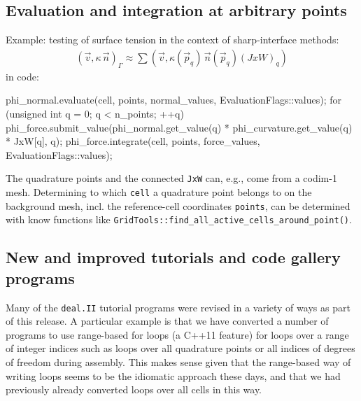 \documentclass{ansarticle-preprint}
\newcommand{\specialword}[1]{\texttt{#1}}
\newcommand{\dealii}{{\specialword{deal.II}}\xspace}
\begin{document}
\subsection{Evaluation and integration at arbitrary points}
\label{subsec:fepointvalues}

Example: testing of surface tension in the context of sharp-interface methods:
\begin{align*}
\left(\vec{v}, \kappa \, \vec{n}\right)_\Gamma
\approx
\sum\left(\vec{v}, \kappa(\vec{p}_q) \, \vec{n}(\vec{p}_q) (JxW)_q\right)
\end{align*}
in code:
\begin{c++}
phi_normal.evaluate(cell, points, normal_values, EvaluationFlags::values);
for (unsigned int q = 0; q < n_points; ++q)
   phi_force.submit_value(phi_normal.get_value(q) *
                          phi_curvature.get_value(q) * JxW[q], q);
phi_force.integrate(cell, points, force_values, EvaluationFlags::values);
\end{c++}
The quadrature points and the connected \texttt{JxW} can, e.g., come from a
codim-1 mesh. Determining to which \texttt{cell} a quadrature point belongs
to on the background mesh, incl. the reference-cell coordinates \texttt{points},
can be determined with know functions like \texttt{GridTools::find\_all\_active\_cells\_around\_point()}.


\subsection{New and improved tutorials and code gallery programs}
\label{subsec:steps}

Many of the \dealii{} tutorial programs were revised in a variety of
ways as part of this release. A particular example is that we have
converted a number of programs to use range-based for loops (a C++11
feature) for loops over a range of integer indices such as loops over
all quadrature points or all indices of degrees of freedom during
assembly. This makes sense given that the
range-based way of writing loops seems to be the idiomatic approach
these days, and that we had previously already converted loops over
all cells in this way.
\end{document}

